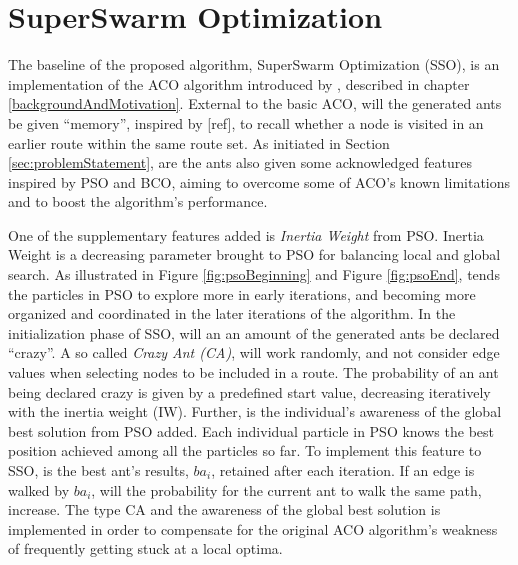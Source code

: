 \section{SuperSwarm Optimization}

The baseline of the proposed algorithm, SuperSwarm Optimization (SSO), is an implementation of the ACO algorithm introduced by \citet{nanda11}, described in chapter \vref{backgroundAndMotivation}. External to the basic ACO, will the generated ants be given ``memory'', inspired by [ref], to recall whether a node is visited in an earlier route within the same route set. As initiated in Section \vref{sec:problemStatement}, are the ants also given some acknowledged features inspired by PSO and BCO, aiming to overcome some of ACO's known limitations and to boost the algorithm's performance. 

One of the supplementary features added is \textit{Inertia Weight} from PSO. Inertia Weight is a decreasing parameter brought to PSO for balancing local and global search. As illustrated in Figure \vref{fig:psoBeginning} and Figure \vref{fig:psoEnd}, tends the particles in PSO to explore more in early iterations, and becoming more organized and coordinated in the later iterations of the algorithm. In the initialization phase of SSO, will an an amount of the generated ants be declared ``crazy''. A so called \textit{Crazy Ant (CA)}, will work randomly, and not consider edge values when selecting nodes to be included in a route. The probability of an ant being declared crazy is given by a predefined start value, decreasing iteratively with the inertia weight (IW). %
Further, is the individual's awareness of the global best solution from PSO added. Each individual particle in PSO knows the best position achieved among all the particles so far. To implement this feature to SSO,  is the best ant's results, $ba_i$, retained after each iteration. If an edge is walked by $ba_i$, will the probability for the current ant to walk the same path, increase. The type CA and the awareness of the global best solution is implemented in order to compensate for the original ACO algorithm's weakness of frequently getting stuck at a local optima. %

